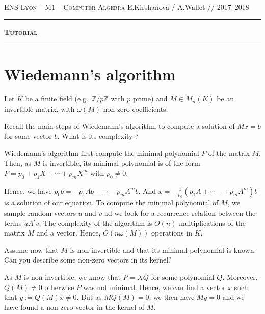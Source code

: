 \documentclass[11pt]{exam}
\theoremstyle{definition}
\begin{document}
{\noindent
   \textsc{ENS Lyon --  M1 -- Computer Algebra}
   \hfill {E.Kirshanova / A.Wallet // 2017--2018\\
  }
  \hrule
  \begin{center}
    {\Large\textbf{
   \textsc{Tutorial }
    } } 
  \end{center}
  \hrule \vspace{5mm}

\thispagestyle{empty}

\vspace{0.2cm}

\section{Wiedemann's algorithm}
Let $K$ be a finite field (e.g.~$\mathbb Z/p\mathbb Z$ with $p$ prime) and $M \in M_n(K)$ be an invertible matrix, with $\omega(M)$ non zero coefficients.
\begin{questions}
	\question Recall the main steps of Wiedemann's algorithm to compute a solution of $Mx = b$ for some vector $b$. What is its complexity ?
	
	\begin{solution}
		Wiedemann's algorithm first compute the minimal polynomial $P$ of the matrix $M$. Then, as $M$ is invertible, its minimal polynomial is of the form 
		$P = p_0 + p_1 X + \cdots + p_m X^m$ with $p_0 \neq 0$.
		
		Hence, we have $p_0b =  - p_1 Ab - \cdots - p_m A^mb$. And $x = - \frac{1}{p_0}(p_1 A + \cdots -+ p_m A^m)b$ is a solution of our equation.
		To compute the minimal polynomial of $M$, we sample random vectors $u$ and $v$ ad we look for a recurrence relation between the terms $u A^i v$.
		The complexity of the algorithm is $O(n)$ multiplications of the matrix $M$ and a vector. Hence, $O(n\omega(M))$ operations in $K$.
	\end{solution}
	
	\question Assume now that $M$ is non invertible and that its minimal polynomial is known. Can you describe some non-zero vectors in its kernel?
        \begin{solution}
 As $M$ is non invertible, we know that $P = XQ$ for some polynomial $Q$. Moreover, $Q(M) \neq 0$ otherwise $P$ was not minimal. Hence, we can find a vector $x$ such that $y := Q(M)x \neq 0$. But as $MQ(M) = 0$, we then have $M y =0$ and we have found a non zero vector in the kernel of $M$. 
          \end{solution}
        

\end{questions}}
\end{document}
